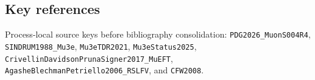 \subsection*{Key references}
Process-local source keys before bibliography consolidation:
\texttt{PDG2026\_MuonS004R4}, \texttt{SINDRUM1988\_Mu3e},
\texttt{Mu3eTDR2021}, \texttt{Mu3eStatus2025},
\texttt{CrivellinDavidsonPrunaSigner2017\_MuEFT},
\texttt{AgasheBlechmanPetriello2006\_RSLFV}, and \texttt{CFW2008}.
